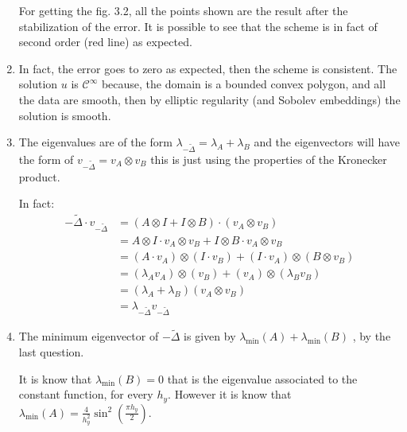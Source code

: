 \documentclass{article}
\numberwithin{equation}{section}
\begin{document}
\begin{enumerate}[label=(\alph*)]
        For getting the fig. 3.2, all the points shown are the result after the stabilization of the error. It is possible to see that the scheme is in fact of second order (red line) as expected.
        \item In fact, the error goes to zero as expected, then the scheme is consistent. The solution $u$ is $\mathcal{C}^{\infty}$ because, the domain is a bounded convex polygon, and all the data are smooth, then by elliptic regularity (and Sobolev embeddings) the solution is smooth.
    
        \item The eigenvalues are of the form $\lambda_{-\tilde{\Delta}} = \lambda_A + \lambda_B$ and the eigenvectors will have the form of $v_{-\tilde{\Delta}} = v_A \otimes v_B$ this is just using the properties of the Kronecker product.
        
        In fact:\begin{align*}
            -\tilde{\Delta} \cdot v_{-\tilde{\Delta}}
            & = (A \otimes I + I \otimes B) \cdot (v_A \otimes v_B) \\
            & = A \otimes I \cdot v_A \otimes v_B + I \otimes B \cdot v_A \otimes v_B\\
            & = (A \cdot v_A) \otimes (I \cdot v_B) + (I \cdot v_A) \otimes (B \otimes v_B)\\
            & = (\lambda_A v_A) \otimes (v_B) + (v_A) \otimes (\lambda_B v_B)\\
            & = (\lambda_A + \lambda_B)(v_A \otimes v_B)\\
            & = \lambda_{-\tilde{\Delta}}v_{-\tilde{\Delta}}
        \end{align*}

        \item The minimum eigenvector of $-\tilde{\Delta}$ is given by $\lambda_{\min}(A) + \lambda_{\min}(B)$ , by the last question.
        
        It is know that $\lambda_{\min}(B) = 0$ that is the eigenvalue associated to the constant function, for every $h_y$. However it is know that $\lambda_{\min}(A) = \frac{4}{h_y^2}\sin^2{(\frac{\pi h_y}{2})}$.


\end{enumerate}
\end{document}
